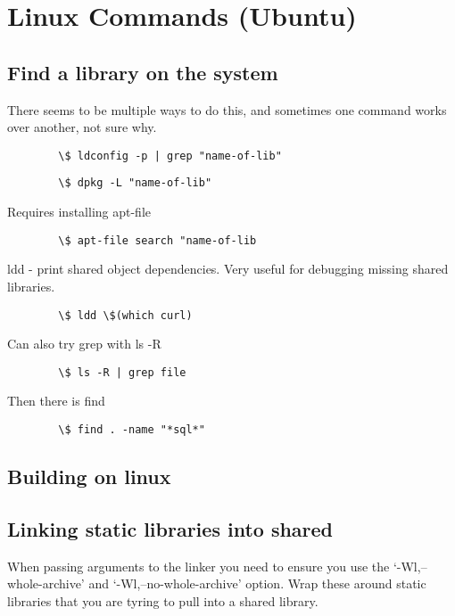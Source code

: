 \documentclass[../LabBook]{subfiles}
\begin{document}
    \section{Linux Commands (Ubuntu)}

    \subsection{Find a library on the system}
    There seems to be multiple ways to do this, and sometimes one command works over another, not sure why.

    \begin{verbatim}
        \$ ldconfig -p | grep "name-of-lib"
    \end{verbatim}
    \begin{verbatim}
        \$ dpkg -L "name-of-lib"
    \end{verbatim}

    Requires installing apt-file
    \begin{verbatim}
        \$ apt-file search "name-of-lib
    \end{verbatim}

    ldd - print shared object dependencies. Very useful for debugging missing shared libraries.
    \begin{verbatim}
        \$ ldd \$(which curl)
    \end{verbatim}

    Can also try grep with ls -R
    \begin{verbatim}
        \$ ls -R | grep file
    \end{verbatim}

    Then there is find
    \begin{verbatim}
        \$ find . -name "*sql*"
    \end{verbatim}

    \subsection{Building on linux}

    \subsection{Linking static libraries into shared}
    When passing arguments to the linker you need to ensure you use the `-Wl,--whole-archive' and
    `-Wl,--no-whole-archive' option. Wrap these around static libraries that you are tyring
    to pull into a shared library.
\end{document}
